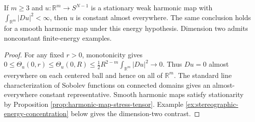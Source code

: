 \begin{corollary}\label{cor:finite-energy-harmonic-liouville}
If $m\ge3$ and $u:\mathbb R^m\to S^{N-1}$ is a stationary weak harmonic map with $\int_{\mathbb R^m}|Du|^2<\infty$, then $u$ is constant almost everywhere. The same conclusion holds for a smooth harmonic map under this energy hypothesis. Dimension two admits nonconstant finite-energy examples.
\end{corollary}
\begin{proof}
For any fixed $r>0$, monotonicity gives $0\le\Theta_u(0,r)\le\Theta_u(0,R)\le \frac12R^{2-m}\int_{\mathbb R^m}|Du|^2\to0$. Thus $Du=0$ almost everywhere on each centered ball and hence on all of $\mathbb R^m$. The standard line characterization of Sobolev functions on connected domains gives an almost-everywhere constant representative. Smooth harmonic maps satisfy stationarity by Proposition \ref{prop:harmonic-map-stress-tensor}. Example \ref{ex:stereographic-energy-concentration} below gives the dimension-two contrast.
\end{proof}
